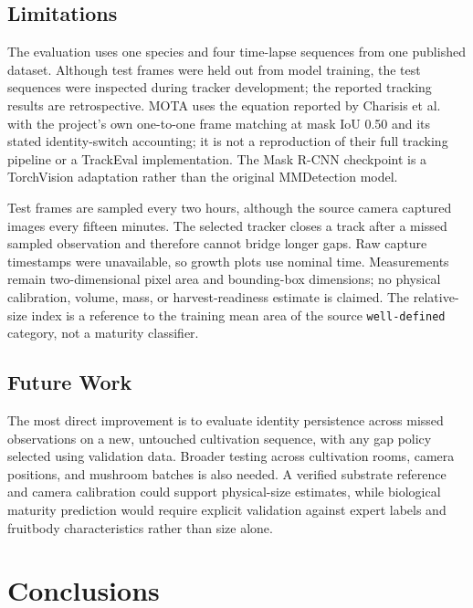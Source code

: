 \documentclass[11pt,a4paper]{article}
\begin{document}
\subsection{Limitations}

The evaluation uses one species and four time-lapse sequences from one published dataset. Although test frames were held out from model training, the test sequences were inspected during tracker development; the reported tracking results are retrospective. MOTA uses the equation reported by Charisis et al. with the project's own one-to-one frame matching at mask IoU 0.50 and its stated identity-switch accounting; it is not a reproduction of their full tracking pipeline or a TrackEval implementation. The Mask R-CNN checkpoint is a TorchVision adaptation rather than the original MMDetection model.

Test frames are sampled every two hours, although the source camera captured images every fifteen minutes. The selected tracker closes a track after a missed sampled observation and therefore cannot bridge longer gaps. Raw capture timestamps were unavailable, so growth plots use nominal time. Measurements remain two-dimensional pixel area and bounding-box dimensions; no physical calibration, volume, mass, or harvest-readiness estimate is claimed. The relative-size index is a reference to the training mean area of the source \texttt{well-defined} category, not a maturity classifier.

\subsection{Future Work}

The most direct improvement is to evaluate identity persistence across missed observations on a new, untouched cultivation sequence, with any gap policy selected using validation data. Broader testing across cultivation rooms, camera positions, and mushroom batches is also needed. A verified substrate reference and camera calibration could support physical-size estimates, while biological maturity prediction would require explicit validation against expert labels and fruitbody characteristics rather than size alone.

\section{Conclusions}
\end{document}
